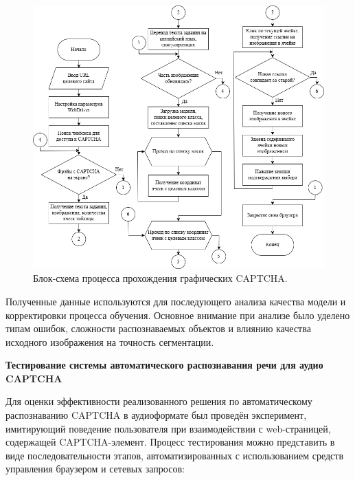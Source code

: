 \begin{figure}[H]
    \centering
    \includegraphics[width=1\textwidth]{imgs/imagecaptcha/solve_captcha_flow.png}
    \caption{Блок-схема процесса прохождения графических CAPTCHA.}
    \label{fig:solve-captcha}
\end{figure}
\vspace{-0.85cm}

Полученные данные используются для последующего анализа качества модели и 
корректировки процесса обучения. Основное внимание при анализе было уделено 
типам ошибок, сложности распознаваемых объектов и влиянию качества исходного 
изображения на точность сегментации.

\textbf{Тестирование системы автоматического распознавания речи для аудио CAPTCHA}

Для оценки эффективности реализованного решения по автоматическому распознаванию 
CAPTCHA в аудиоформате был проведён эксперимент, имитирующий поведение 
пользователя при взаимодействии с web-страницей, содержащей CAPTCHA-элемент. 
Процесс тестирования можно представить в виде последовательности этапов, 
автоматизированных с использованием средств управления браузером и сетевых 
запросов:

